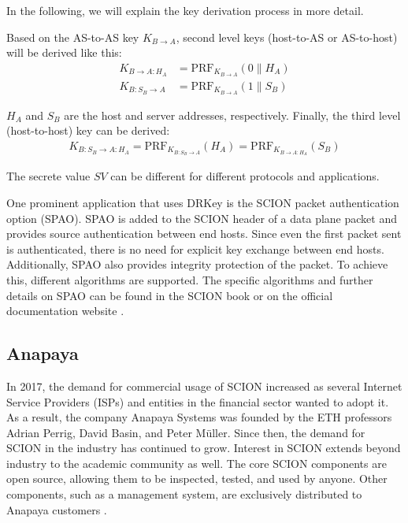 In the following, we will explain the key derivation process in more detail.

Based on the AS-to-AS key $K_{B \rightarrow A}$, second level keys (host-to-AS or AS-to-host) will be derived like this:
\begin{align*}
K_{B \rightarrow A:H_A} &= \text{PRF}_{K_{B \rightarrow A}}(0 \parallel H_A) \\
K_{B:S_B \rightarrow A} &= \text{PRF}_{K_{B \rightarrow A}}(1 \parallel S_B)
\end{align*}

$H_A$ and $S_B$ are the host and server addresses, respectively.
Finally, the third level (host-to-host) key can be derived:
\begin{align*}
    K_{B:S_B \rightarrow A:H_A} = \text{PRF}_{K_{B:S_B \rightarrow A}}(H_A) = \text{PRF}_{K_{B \rightarrow  A:H_A}}(S_B)
\end{align*}

The secrete value $SV$ can be different for different protocols and applications.

\label{sec:spao}
One prominent application that uses DRKey is the SCION packet authentication option (SPAO).
SPAO is added to the SCION header of a data plane packet and provides source authentication between end hosts.
Since even the first packet sent is authenticated, there is no need for explicit key exchange between end hosts.
Additionally, SPAO also provides integrity protection of the packet.
To achieve this, different algorithms are supported.
The specific algorithms and further details on SPAO can be found in the SCION book or on the official documentation website \cite{anapayaSCIONPacket}.


\subsection{Anapaya}
In 2017, the demand for commercial usage of SCION increased as several Internet Service Providers (ISPs) and entities in the financial sector wanted to adopt it.
As a result, the company Anapaya Systems was founded by the ETH professors Adrian Perrig, David Basin, and Peter Müller.
Since then, the demand for SCION in the industry has continued to grow.
Interest in SCION extends beyond industry to the academic community as well.
The core SCION components are open source, allowing them to be inspected, tested, and used by anyone.
Other components, such as a management system, are exclusively distributed to Anapaya customers \cite{ethzSecureInternet}.

